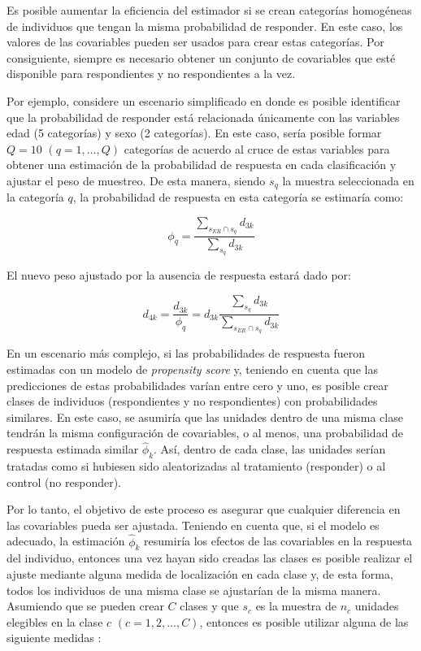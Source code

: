 \documentclass[
  12pt,
]{book}
\begin{document}
Es posible aumentar la eficiencia del estimador si se crean categorías homogéneas de individuos que tengan la misma probabilidad de responder. En este caso, los valores de las covariables pueden ser usados para crear estas categorías. Por consiguiente, siempre es necesario obtener un conjunto de covariables que esté disponible para respondientes y no respondientes a la vez.

Por ejemplo, considere un escenario simplificado en donde es posible identificar que la probabilidad de responder está relacionada únicamente con las variables edad (5 categorías) y sexo (2 categorías). En este caso, sería posible formar \(Q=10\) \((q = 1, \ldots, Q)\) categorías de acuerdo al cruce de estas variables para obtener una estimación de la probabilidad de respuesta en cada clasificación y ajustar el peso de muestreo. De esta manera, siendo \(s_{q}\) la muestra seleccionada en la categoría \(q\), la probabilidad de respuesta en esta categoría se estimaría como:

\[
\phi_{q} = \frac{\sum_{s_{ER}\cap s_q}d_{3k}}{\sum_{s_{q}}d_{3k}}
\]

El nuevo peso ajustado por la ausencia de respuesta estará dado por:

\[
d_{4k} = \frac{d_{3k}}{\phi_{q}} 
= d_{3k}\frac{\sum_{s_q}d_{3k}}{\sum_{s_{ER}\cap s_q}d_{3k}}
\]

En un escenario más complejo, si las probabilidades de respuesta fueron estimadas con un modelo de \emph{propensity score} y, teniendo en cuenta que las predicciones de estas probabilidades varían entre cero y uno, es posible crear clases de individuos (respondientes y no respondientes) con probabilidades similares. En este caso, se asumiría que las unidades dentro de una misma clase tendrán la misma configuración de covariables, o al menos, una probabilidad de respuesta estimada similar \(\hat\phi_k\). Así, dentro de cada clase, las unidades serían tratadas como si hubiesen sido aleatorizadas al tratamiento (responder) o al control (no responder).

Por lo tanto, el objetivo de este proceso es asegurar que cualquier diferencia en las covariables pueda ser ajustada. Teniendo en cuenta que, si el modelo es adecuado, la estimación \(\hat\phi_k\) resumiría los efectos de las covariables en la respuesta del individuo, entonces una vez hayan sido creadas las clases es posible realizar el ajuste mediante alguna medida de localización en cada clase y, de esta forma, todos los individuos de una misma clase se ajustarían de la misma manera. Asumiendo que se pueden crear \(C\) clases y que \(s_c\) es la muestra de \(n_c\) unidades elegibles en la clase \(c\) \((c=1, 2, \ldots, C)\), entonces es posible utilizar alguna de las siguiente medidas \citep{Valliant_Dever_2017}:
\end{document}
